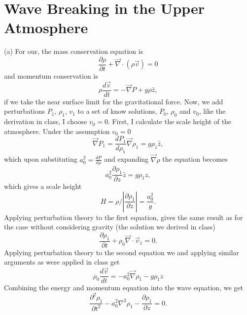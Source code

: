 \documentclass[11pt]{article}
\begin{document}
\section{Wave Breaking in the Upper Atmosphere}
\label{sec:org2801f4b}
(a) For our, the mass conservation equation is
\begin{equation}
 \frac{\partial \rho}{\partial t} + \vec{\nabla} \cdot (\rho \vec{v}) = 0
\end{equation}
and momentum conservation is
\begin{equation}
 \rho \frac{d \vec{v}}{dt} = - \vec{\nabla} P + g \rho \hat{z},
\end{equation}
if we take the near surface limit for the gravitational force.
Now, we add perturbations \(P_1\), \(\rho_1\), \(v_1\) to a set of know solutions, \(P_0\), \(\rho_0\) and \(v_0\), like the derivation in class, I choose \(v_0 = 0\).
First, I calculate the scale height of the atmosphere.
Under the assumption \(v_0 = 0\)
\begin{equation}
 \vec{\nabla} P_1 = \frac{d P_1}{d \rho _1} \vec{\nabla} \rho_1 =g \rho_1 \hat{z},
\end{equation}
which upon substituting \(a_0^2 = \frac{d P}{d \rho}\) and expanding \(\vec{\nabla} \rho\) the equation becomes
\begin{equation}
  a_0^2 \frac{\partial \rho_1}{\partial z} \hat{z} = g \rho_1 \hat{z},
\end{equation}
which gives a scale height
\begin{equation}
  H = \rho / \left | \frac{\partial \rho_1}{\partial z} \right | = \frac{a_0^2}{g}.
\end{equation}
Applying perturbation theory to the first equation, gives the same result as for the case without considering gravity (the solution we derived in class)
\begin{equation}
 \frac{\partial \rho_1}{\partial t} + \rho_0 \vec{ \nabla } \cdot \vec{v}_1 = 0.
\end{equation}
Applying perturbation theory to the second equation we and applying similar arguments as were applied in class get
\begin{equation}
 \rho_0 \frac{d \vec{v}}{dt} = -a_0^2 \vec{\nabla} \rho_1 - g \rho_1 \hat{z}
\end{equation}
Combining the energy and momentum equation into the wave equation, we get
\begin{equation}
 \frac{\partial^2 \rho_1}{\partial t^2}
 - a_0^2 \nabla^2 \rho_1
 - \frac{\partial \rho_1}{\partial z}
 = 0.
\end{equation}
\end{document}
